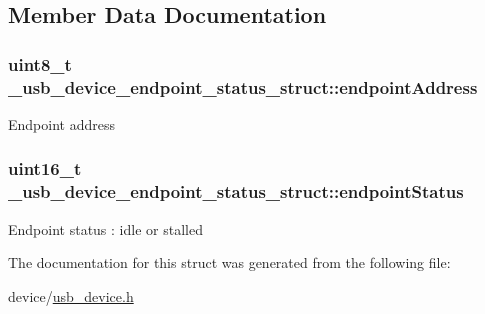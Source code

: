 \subsection{Member Data Documentation}
\hypertarget{struct__usb__device__endpoint__status__struct_afada98f49022f451e7d682513e92993f}{
\subsubsection[{endpoint\-Address}]{\setlength{\rightskip}{0pt plus 5cm}uint8\-\_\-t \-\_\-usb\-\_\-device\-\_\-endpoint\-\_\-status\-\_\-struct\-::endpoint\-Address}}\label{struct__usb__device__endpoint__status__struct_afada98f49022f451e7d682513e92993f}
Endpoint address \hypertarget{struct__usb__device__endpoint__status__struct_a5b41ac50b0851879961061170630dc88}{
\subsubsection[{endpoint\-Status}]{\setlength{\rightskip}{0pt plus 5cm}uint16\-\_\-t \-\_\-usb\-\_\-device\-\_\-endpoint\-\_\-status\-\_\-struct\-::endpoint\-Status}}\label{struct__usb__device__endpoint__status__struct_a5b41ac50b0851879961061170630dc88}
Endpoint status \-: idle or stalled 

The documentation for this struct was generated from the following file\-:\begin{DoxyCompactItemize}
\item 
device/\hyperlink{usb__device_8h}{usb\-\_\-device.\-h}\end{DoxyCompactItemize}
